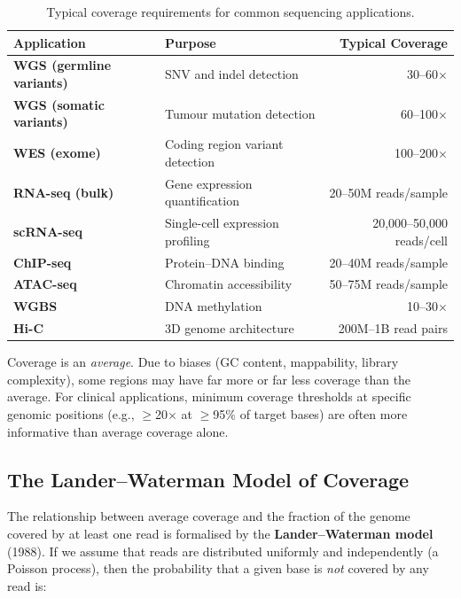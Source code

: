 \begin{table}[htbp]
\centering
\caption{Typical coverage requirements for common sequencing applications.}
\label{tab:seqprinciples:coverage-requirements}
\small
\begin{tabularx}{\textwidth}{>{\bfseries}l X r}
\toprule
\textbf{Application} & \textbf{Purpose} & \textbf{Typical Coverage} \\
\midrule
WGS (germline variants) & SNV and indel detection & 30--60$\times$ \\
WGS (somatic variants) & Tumour mutation detection & 60--100$\times$ \\
WES (exome) & Coding region variant detection & 100--200$\times$ \\
RNA-seq (bulk) & Gene expression quantification & 20--50M reads/sample \\
scRNA-seq & Single-cell expression profiling & 20,000--50,000 reads/cell \\
ChIP-seq & Protein--DNA binding & 20--40M reads/sample \\
ATAC-seq & Chromatin accessibility & 50--75M reads/sample \\
WGBS & DNA methylation & 10--30$\times$ \\
Hi-C & 3D genome architecture & 200M--1B read pairs \\
\bottomrule
\end{tabularx}
\end{table}

\begin{warningbox}
Coverage is an \textit{average}. Due to biases (GC content, mappability, library complexity), some regions may have far more or far less coverage than the average. For clinical applications, minimum coverage thresholds at specific genomic positions (e.g., $\geq$20$\times$ at $\geq$95\% of target bases) are often more informative than average coverage alone.
\end{warningbox}


\subsection{The Lander--Waterman Model of Coverage}
\label{subsec:seqprinciples:lander-waterman}

The relationship between average coverage and the fraction of the genome covered by at least one read is formalised by the \textbf{Lander--Waterman model} (1988). If we assume that reads are distributed uniformly and independently (a Poisson process), then the probability that a given base is \textit{not} covered by any read is:

